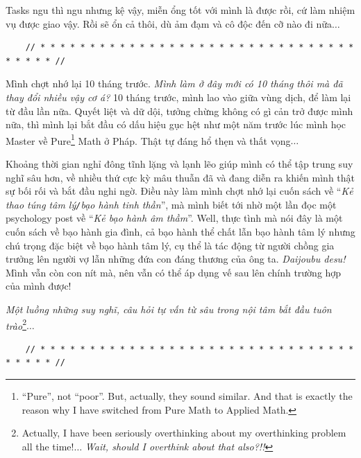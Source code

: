 \documentclass[12pt]{article}
\numberwithin{equation}{section}
\begin{document}
Tasks ngu thì ngu nhưng kệ vậy, miễn ổng tốt với mình là được rồi, cứ làm nhiệm vụ được giao vậy. Rồi sẽ ổn cả thôi, dù ảm đạm và cô độc đến cỡ nào đi nữa$\ldots$

\begin{verbatim}
    // * * * * * * * * * * * * * * * * * * * * * * * * * * * * * * * * * * * * * //
\end{verbatim}

\noindent
{} Mình chợt nhớ lại 10 tháng trước. \textit{Mình làm ở đây mới có 10 tháng thôi mà đã thay đổi nhiều vậy cơ á?} 10 tháng trước, mình lao vào giữa vùng dịch, để làm lại từ đầu lần nữa. Quyết liệt và dữ dội, tưởng chừng không có gì cản trở được mình nữa, thì mình lại bắt đầu có dấu hiệu gục hệt như một năm trước lúc mình học Master về Pure\footnote{``Pure'', not ``poor''. But, actually, they sound similar. And that is exactly the reason why I have switched from Pure Math to Applied Math.} Math ở Pháp. Thật tự đáng hổ thẹn và thất vọng$\ldots$

Khoảng thời gian nghỉ đông tĩnh lặng và lạnh lẽo giúp mình có thể tập trung suy nghĩ sâu hơn, về nhiều thứ cực kỳ mâu thuẫn đã và đang diễn ra khiến mình thật sự bối rối và bắt đầu nghi ngờ. Điều này làm mình chợt nhớ lại cuốn sách \cite{Bancroft2003} về ``\textit{Kẻ thao túng tâm lý\texttt{/}bạo hành tinh thần}'', mà mình biết tới nhờ một lần đọc một psychology post về ``\textit{Kẻ bạo hành âm thầm}''. Well, thực tình mà nói đây là một cuốn sách về bạo hành gia đình, cả bạo hành thể chất lẫn bạo hành tâm lý nhưng chú trọng đặc biệt về bạo hành tâm lý, cụ thể là tác động từ người chồng gia trưởng lên người vợ lẫn những đứa con đáng thương của ông ta. \textit{Daijoubu desu!} Mình vẫn còn con nít mà, nên vẫn có thể áp dụng vế sau lên chính trường hợp của mình được!

\textit{Một luồng những suy nghĩ, câu hỏi tự vấn từ sâu trong nội tâm bắt đầu tuôn trào}\footnote{Actually, I have been seriously overthinking about my overthinking problem all the time!$\ldots$ \textit{Wait, should I overthink about that also?!!}}$\ldots$

\begin{verbatim}
    // * * * * * * * * * * * * * * * * * * * * * * * * * * * * * * * * * * * * * //
\end{verbatim}
\end{document}
